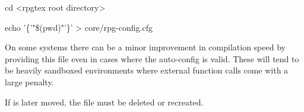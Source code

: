 				\begin{Code}
					cd <rpgtex root directory>

					echo '\{'"\$(pwd)"'\}' > core/rpg-config.cfg
				\end{Code}
				On some systems there can be a minor improvement in compilation speed by providing this file even in cases where the auto-config is valid. These will tend to be heavily sandboxed environments where external function calls come with a large penalty.

				If \rpgtex{} is later moved, the file must be deleted or recreated.


